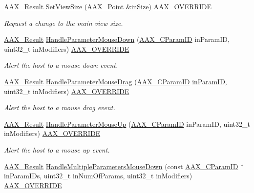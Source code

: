\begin{DoxyCompactItemize}
\mbox{\hyperlink{a00392_a4d8f69a697df7f70c3a8e9b8ee130d2f}{A\+A\+X\+\_\+\+Result}} \mbox{\hyperlink{a01945_a7c0ca66b8b7b79c5b97f987c60ebbefc}{Set\+View\+Size}} (\mbox{\hyperlink{a01609}{A\+A\+X\+\_\+\+Point}} \&in\+Size) \mbox{\hyperlink{a00392_ac2f24a5172689ae684344abdcce55463}{A\+A\+X\+\_\+\+O\+V\+E\+R\+R\+I\+DE}}
\begin{DoxyCompactList}\small\item\em Request a change to the main view size. \end{DoxyCompactList}\item 
\mbox{\hyperlink{a00392_a4d8f69a697df7f70c3a8e9b8ee130d2f}{A\+A\+X\+\_\+\+Result}} \mbox{\hyperlink{a01945_a9f59dafeb761114a943463a3339593ae}{Handle\+Parameter\+Mouse\+Down}} (\mbox{\hyperlink{a00392_a1440c756fe5cb158b78193b2fc1780d1}{A\+A\+X\+\_\+\+C\+Param\+ID}} in\+Param\+ID, uint32\+\_\+t in\+Modifiers) \mbox{\hyperlink{a00392_ac2f24a5172689ae684344abdcce55463}{A\+A\+X\+\_\+\+O\+V\+E\+R\+R\+I\+DE}}
\begin{DoxyCompactList}\small\item\em Alert the host to a mouse down event. \end{DoxyCompactList}\item 
\mbox{\hyperlink{a00392_a4d8f69a697df7f70c3a8e9b8ee130d2f}{A\+A\+X\+\_\+\+Result}} \mbox{\hyperlink{a01945_ad6d3ab30a88f62709ec04a88097b1241}{Handle\+Parameter\+Mouse\+Drag}} (\mbox{\hyperlink{a00392_a1440c756fe5cb158b78193b2fc1780d1}{A\+A\+X\+\_\+\+C\+Param\+ID}} in\+Param\+ID, uint32\+\_\+t in\+Modifiers) \mbox{\hyperlink{a00392_ac2f24a5172689ae684344abdcce55463}{A\+A\+X\+\_\+\+O\+V\+E\+R\+R\+I\+DE}}
\begin{DoxyCompactList}\small\item\em Alert the host to a mouse drag event. \end{DoxyCompactList}\item 
\mbox{\hyperlink{a00392_a4d8f69a697df7f70c3a8e9b8ee130d2f}{A\+A\+X\+\_\+\+Result}} \mbox{\hyperlink{a01945_ae3e0200e1b2271638c97e772e0153368}{Handle\+Parameter\+Mouse\+Up}} (\mbox{\hyperlink{a00392_a1440c756fe5cb158b78193b2fc1780d1}{A\+A\+X\+\_\+\+C\+Param\+ID}} in\+Param\+ID, uint32\+\_\+t in\+Modifiers) \mbox{\hyperlink{a00392_ac2f24a5172689ae684344abdcce55463}{A\+A\+X\+\_\+\+O\+V\+E\+R\+R\+I\+DE}}
\begin{DoxyCompactList}\small\item\em Alert the host to a mouse up event. \end{DoxyCompactList}\item 
\mbox{\hyperlink{a00392_a4d8f69a697df7f70c3a8e9b8ee130d2f}{A\+A\+X\+\_\+\+Result}} \mbox{\hyperlink{a01945_ace8d66f35f57a9ac6353f3b741972279}{Handle\+Multiple\+Parameters\+Mouse\+Down}} (const \mbox{\hyperlink{a00392_a1440c756fe5cb158b78193b2fc1780d1}{A\+A\+X\+\_\+\+C\+Param\+ID}} $\ast$in\+Param\+I\+Ds, uint32\+\_\+t in\+Num\+Of\+Params, uint32\+\_\+t in\+Modifiers) \mbox{\hyperlink{a00392_ac2f24a5172689ae684344abdcce55463}{A\+A\+X\+\_\+\+O\+V\+E\+R\+R\+I\+DE}}

\end{DoxyCompactItemize}
